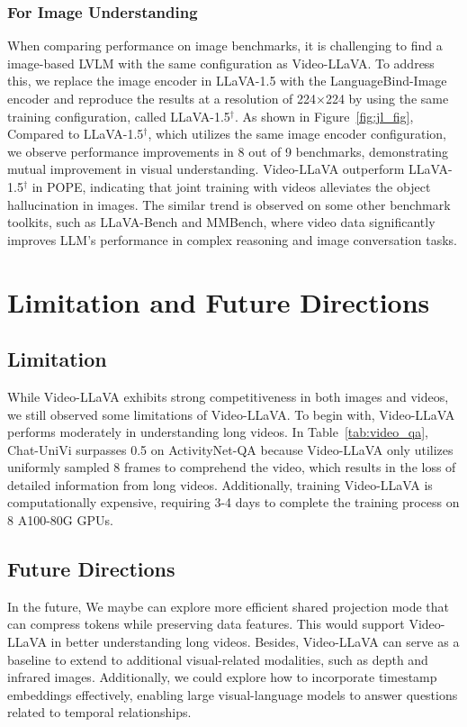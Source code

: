 \subsubsection{For Image Understanding}
\label{sec:jt_img}
When comparing performance on image benchmarks, it is challenging to find a image-based LVLM with the same configuration as Video-LLaVA. To address this, we replace the image encoder in LLaVA-1.5 with the LanguageBind-Image encoder and reproduce the results at a resolution of 224×224 by using the same training configuration, called LLaVA-1.5$^\dag$. As shown in Figure~\ref{fig:jl_fig}, Compared to LLaVA-1.5$^\dag$, which utilizes the same image encoder configuration, we observe performance improvements in 8 out of 9 benchmarks, demonstrating mutual improvement in visual understanding. Video-LLaVA outperform LLaVA-1.5$^\dag$ in POPE, indicating that joint training with videos alleviates the object hallucination in images. The similar trend is observed on some other benchmark toolkits, such as LLaVA-Bench and MMBench, where video data significantly improves LLM's performance in complex reasoning and image conversation tasks. 

\section{Limitation and Future Directions}

\subsection{Limitation} While Video-LLaVA exhibits strong competitiveness in both images and videos, we still observed some limitations of Video-LLaVA. To begin with, Video-LLaVA performs moderately in understanding long videos. In Table~\ref{tab:video_qa}, Chat-UniVi surpasses 0.5 on ActivityNet-QA because Video-LLaVA only utilizes uniformly sampled 8 frames to comprehend the video, which results in the loss of detailed information from long videos. Additionally, training Video-LLaVA is computationally expensive, requiring 3-4 days to complete the training process on 8 A100-80G GPUs. 

\subsection{Future Directions} In the future, We maybe can explore more efficient shared projection mode that can compress tokens while preserving data features. This would support Video-LLaVA in better understanding long videos. Besides, Video-LLaVA can serve as a baseline to extend to additional visual-related modalities, such as depth and infrared images. Additionally, we could explore how to incorporate timestamp embeddings effectively, enabling large visual-language models to answer questions related to temporal relationships.

